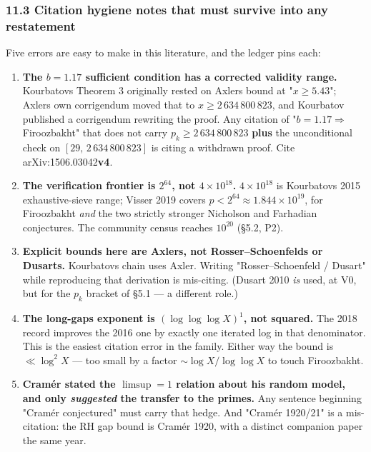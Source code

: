 \documentclass[
  a4paper,
  11pt]{article}
\providecommand{\tightlist}{%
  \setlength{\itemsep}{0pt}\setlength{\parskip}{0pt}}
\begin{document}
\subsubsection{11.3 Citation hygiene notes that must survive into any
restatement}\label{113-citation-hygiene-notes-that-must-survive-into-any-restatement}

Five errors are easy to make in this literature, and the ledger pins
each:

\begin{enumerate}
\def\labelenumi{\arabic{enumi}.}
\tightlist
\item
  \textbf{The \(b = 1.17\) sufficient condition has a corrected validity
  range.} Kourbatov\textquotesingle s Theorem 3 originally rested on
  Axler\textquotesingle s bound at "\(x \ge 5.43\)";
  Axler\textquotesingle s own corrigendum moved that to
  \(x \ge 2\,634\,800\,823\), and Kourbatov published a corrigendum
  rewriting the proof. Any citation of "\(b = 1.17 \Rightarrow\)
  Firoozbakht" that does not carry \(p_k \ge 2\,634\,800\,823\)
  \textbf{plus} the unconditional check on \([29,\, 2\,634\,800\,823]\)
  is citing a withdrawn proof. Cite arXiv:1506.03042\textbf{v4}.
\item
  \textbf{The verification frontier is \(2^{64}\), not
  \(4\times10^{18}\).} \(4\times10^{18}\) is Kourbatov\textquotesingle s
  2015 exhaustive-sieve range; Visser 2019 covers \(p < 2^{64} \approx
  1.844\times10^{19}\), for Firoozbakht \emph{and} the two strictly
  stronger Nicholson and Farhadian conjectures. The community census
  reaches \(10^{20}\) (§5.2, P2).
\item
  \textbf{Explicit bounds here are Axler\textquotesingle s, not
  Rosser--Schoenfeld\textquotesingle s or Dusart\textquotesingle s.}
  Kourbatov\textquotesingle s chain uses Axler. Writing
  "Rosser--Schoenfeld / Dusart" while reproducing that derivation is
  mis-citing. (Dusart 2010 \emph{is} used, at V0, but for the \(p_k\)
  bracket of §5.1 --- a different role.)
\item
  \textbf{The long-gaps exponent is \((\log\log\log X)^{1}\), not
  squared.} The 2018 record improves the 2016 one by exactly one
  iterated log in that denominator. This is the easiest citation error
  in the family. Either way the bound is \(\ll \log^2 X\) --- too small
  by a factor \(\sim \log X/\log\log X\) to touch Firoozbakht.
\item
  \textbf{Cramér stated the \(\limsup = 1\) relation about his random
  model, and only \emph{suggested} the transfer to the primes.} Any
  sentence beginning "Cramér conjectured" must carry that hedge. And
  "Cramér 1920/21" is a mis-citation: the RH gap bound is Cramér 1920,
  with a distinct companion paper the same year.
\end{enumerate}
\end{document}
